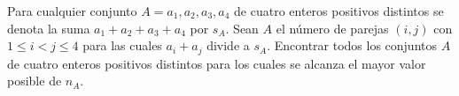 Para cualquier conjunto $A = {a_1, a_2, a_3, a_4}$ de cuatro enteros positivos distintos se denota la suma $a_1+a_2+a_3+a_4$ por $s_A$. Sean $A$ el número de parejas $(i,j)$ con $1\leq i\lt j\leq 4$ para las cuales $a_i + a_j$ divide a $s_A$. Encontrar todos los conjuntos $A$ de cuatro enteros positivos distintos para los cuales se alcanza el mayor valor posible de $n_A$.